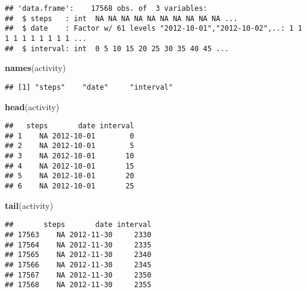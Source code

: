 \documentclass[]{article}
\newenvironment{Shaded}{\begin{snugshade}}{\end{snugshade}}
\newcommand{\KeywordTok}[1]{\textcolor[rgb]{0.13,0.29,0.53}{\textbf{#1}}}
\newcommand{\CommentTok}[1]{\textcolor[rgb]{0.56,0.35,0.01}{\textit{#1}}}
\newcommand{\OperatorTok}[1]{\textcolor[rgb]{0.81,0.36,0.00}{\textbf{#1}}}
\newcommand{\NormalTok}[1]{#1}
\begin{document}
\begin{verbatim}
## 'data.frame':    17568 obs. of  3 variables:
##  $ steps   : int  NA NA NA NA NA NA NA NA NA NA ...
##  $ date    : Factor w/ 61 levels "2012-10-01","2012-10-02",..: 1 1 1 1 1 1 1 1 1 1 ...
##  $ interval: int  0 5 10 15 20 25 30 35 40 45 ...
\end{verbatim}

\begin{Shaded}
\begin{Highlighting}[]
\KeywordTok{names}\NormalTok{(activity)}
\end{Highlighting}
\end{Shaded}

\begin{verbatim}
## [1] "steps"    "date"     "interval"
\end{verbatim}

\begin{Shaded}
\begin{Highlighting}[]
\KeywordTok{head}\NormalTok{(activity)}
\end{Highlighting}
\end{Shaded}

\begin{verbatim}
##   steps       date interval
## 1    NA 2012-10-01        0
## 2    NA 2012-10-01        5
## 3    NA 2012-10-01       10
## 4    NA 2012-10-01       15
## 5    NA 2012-10-01       20
## 6    NA 2012-10-01       25
\end{verbatim}

\begin{Shaded}
\begin{Highlighting}[]
\KeywordTok{tail}\NormalTok{(activity)}
\end{Highlighting}
\end{Shaded}

\begin{verbatim}
##       steps       date interval
## 17563    NA 2012-11-30     2330
## 17564    NA 2012-11-30     2335
## 17565    NA 2012-11-30     2340
## 17566    NA 2012-11-30     2345
## 17567    NA 2012-11-30     2350
## 17568    NA 2012-11-30     2355
\end{verbatim}

\begin{Shaded}
\end{Shaded}
\end{document}
